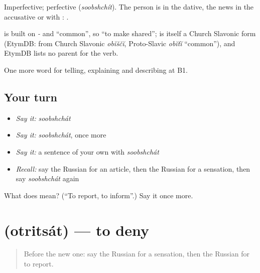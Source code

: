 Imperfective; perfective \emph{} (\emph{soobshchít}). The person is in the dative, the news in the accusative or with \emph{}: \emph{  }.

\begin{cousinweb}
\emph{} is built on \emph{-} and \emph{} \textquotedblleft{}common\textquotedblright{}, so \textquotedblleft{}to make shared\textquotedblright{}; \emph{} is itself a Church Slavonic form (EtymDB: from Church Slavonic \emph{obĭščĭ}, Proto-Slavic \emph{obĭťĭ} \textquotedblleft{}common\textquotedblright{}), and EtymDB lists no parent for the verb.
\end{cousinweb}

\begin{grammarlens}[title={What you've built}]
One more word for telling, explaining and describing at B1.
\end{grammarlens}

\subsection*{Your turn}
\begin{itemize}
\raggedright
  \item \emph{Say it:} \emph{soobshchát}
  \item \emph{Say it:} \emph{soobshchát}, once more
  \item \emph{Say it:} a sentence of your own with \emph{soobshchát}
  \item \emph{Recall:} say the Russian for an article, then the Russian for a sensation, then say \emph{soobshchát} again
\end{itemize}

\begin{tcolorbox}[breakable,colback=teal!4,colframe=teal!35!black,title={Before you move on}]
What does  mean? (\textquotedblleft{}To report, to inform\textquotedblright{}.) Say it once more.
\end{tcolorbox}
\section[\texorpdfstring{\ru{отрицать} (otritsát)}{отрицать (otritsát)}]{ (otritsát) — to deny}

\label{lesson:RU-C280-otritsat}



\begin{quote}
Before the new one: say the Russian for a sensation, then the Russian for to report.
\end{quote}

